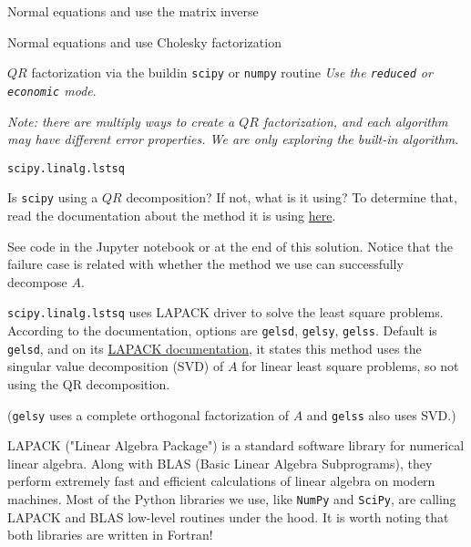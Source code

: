 \documentclass[12pt,letterpaper,answers]{exam}
\begin{document}
\begin{questions}
\begin{parts}


\item Normal equations and use the matrix inverse

\item Normal equations and use Cholesky factorization

\item $QR$ factorization via the buildin \texttt{scipy} or \texttt{numpy} routine \emph{Use the \texttt{reduced} or \texttt{economic} mode}.

\emph{Note: there are multiply ways to create a $QR$ factorization, and each algorithm may have different error properties.  We are only exploring the built-in algorithm}.

\item \texttt{scipy.linalg.lstsq}

Is \texttt{scipy} using a $QR$ decomposition?  If not, what is it using?  To determine that, read the documentation about the method it is using \href{https://netlib.org/lapack/explore-html/d7/d3b/group__double_g_esolve_ga94bd4a63a6dacf523e25ff617719f752.html#ga94bd4a63a6dacf523e25ff617719f752}{here}.


\end{parts}

\begin{solution}
    See code in the Jupyter notebook or at the end of this solution. Notice that the failure case is related with whether the method we use can successfully decompose $A$.

    \texttt{scipy.linalg.lstsq} uses LAPACK driver to solve the least square problems. According to the documentation, options are \texttt{gelsd}, \texttt{gelsy}, \texttt{gelss}. Default is  \texttt{gelsd}, and on its \href{https://netlib.org/lapack/explore-html/d7/d3b/group__double_g_esolve_ga94bd4a63a6dacf523e25ff617719f752.html}{LAPACK documentation}, it states this method uses the singular value decomposition (SVD) of $A$ for linear least square problems, so not using the QR decomposition.

    (\texttt{gelsy} uses a complete orthogonal factorization of $A$ and \texttt{gelss} also uses SVD.)

    LAPACK ("Linear Algebra Package") is a standard software library for numerical linear algebra. Along with BLAS (Basic Linear Algebra Subprograms), they perform extremely fast and efficient calculations of linear algebra on modern machines. Most of the Python libraries we use, like \texttt{NumPy} and \texttt{SciPy}, are calling LAPACK and BLAS low-level routines under the hood. It is worth noting that both libraries are written in Fortran!
\end{solution}



\end{questions}
\end{document}
